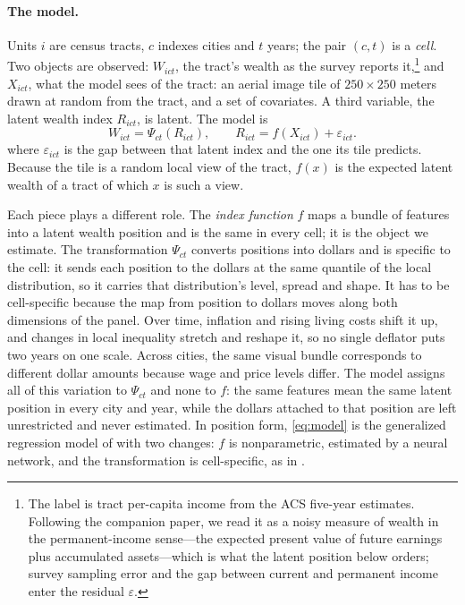 \documentclass[11pt]{article}
\theoremstyle{remark}
\begin{document}
\paragraph{The model.} Units $i$ are census tracts, $c$ indexes cities and $t$ years; the pair
$(c,t)$ is a \emph{cell}. Two objects are observed: $W_{ict}$, the tract's wealth as the survey reports
it,\footnote{The label is tract per-capita income from the ACS five-year estimates. Following the
companion paper, we read it as a noisy measure of wealth in the
permanent-income sense---the expected present value of future earnings plus accumulated assets---which
is what the latent position below orders; survey sampling error and the gap between current and
permanent income enter the residual $\varepsilon$.} and $X_{ict}$, what the model sees of the tract: an
aerial image tile of $250\times250$ meters drawn at random from the tract, and a set of covariates. A third variable, the latent wealth index
$R_{ict}$, is latent. The model is
\begin{equation}\label{eq:model}
    W_{ict} = \Psi_{ct}\!\left(R_{ict}\right),
    \qquad
    R_{ict} = f(X_{ict}) + \varepsilon_{ict}.
\end{equation}
where $\varepsilon_{ict}$ is the gap between that latent index and the one its tile predicts. Because the tile is a random local view of the tract, $f(x)$ is the expected latent wealth of a tract of which $x$ is such a view.

Each piece plays a different role. The \emph{index function} $f$ maps a bundle of features into a latent wealth position and is the same in every cell; it is the object we estimate. The transformation $\Psi_{ct}$ converts positions into dollars and is specific to the cell: it sends each position to the dollars at the same quantile of the local distribution, so it carries that distribution's level, spread and shape. It has to be cell-specific because the map from position to dollars moves along both dimensions of the panel. Over time, inflation and rising living costs shift it up, and changes in local inequality stretch and reshape it, so no single deflator puts two years on one scale. Across cities, the same visual bundle corresponds to different dollar amounts because wage and price levels differ. The model assigns all of this variation to $\Psi_{ct}$ and none to $f$: the same features mean the same latent position in every city and year, while the dollars attached to that position are left unrestricted and never estimated. In position form, \eqref{eq:model} is the generalized regression model of \citet{han1987} with two changes: $f$ is nonparametric, estimated by a neural network, and the transformation is cell-specific, as in \citet{abrevaya2000}.
\end{document}
